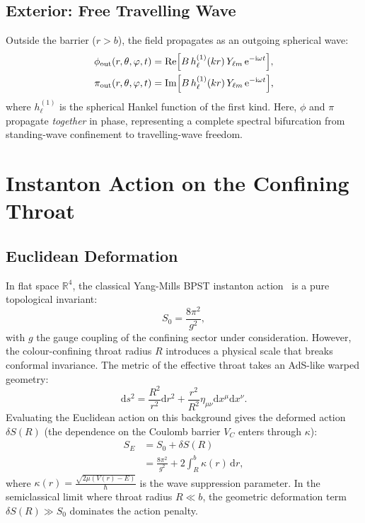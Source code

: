 \documentclass[11pt,a4paper]{article}
\theoremstyle{remark}
\newcommand{\dd}{\mathrm{d}}
\newcommand{\ii}{\mathrm{i}}
\newcommand{\ee}{\mathrm{e}}
\begin{document}
\subsection{Exterior: Free Travelling Wave}
Outside the barrier ($r > b$), the field propagates as an outgoing spherical wave:
\begin{align}
\phi_{\text{out}}(r,\theta,\varphi,t) &= \operatorname{Re}\Bigl[B\,h_\ell^{(1)}(k r)\,Y_{\ell m}\,\ee^{-\ii\omega t}\Bigr], \\
\pi_{\text{out}}(r,\theta,\varphi,t) &= \operatorname{Im}\Bigl[B\,h_\ell^{(1)}(k r)\,Y_{\ell m}\,\ee^{-\ii\omega t}\Bigr],
\end{align}
where $h_\ell^{(1)}$ is the spherical Hankel function of the first kind. Here, $\phi$ and $\pi$ propagate \emph{together} in phase, representing a complete spectral bifurcation from standing-wave confinement to travelling-wave freedom.

\section{Instanton Action on the Confining Throat}

\subsection{Euclidean Deformation}
In flat space $\mathbb{R}^4$, the classical Yang-Mills BPST instanton action~\cite{bpst1975} is a pure topological invariant:
\begin{equation}
S_0 = \frac{8\pi^2}{g^2},
\end{equation}
with $g$ the gauge coupling of the confining sector under consideration.
However, the colour-confining throat radius $R$ introduces a physical scale that breaks conformal invariance. The metric of the effective throat takes an AdS-like warped geometry:
\begin{equation}
\dd s^2 = \frac{R^2}{r^2}\dd r^2 + \frac{r^2}{R^2}\eta_{\mu\nu}\dd x^\mu \dd x^\nu.
\end{equation}
Evaluating the Euclidean action on this background gives the deformed action $\delta S(R)$ (the dependence on the Coulomb barrier $V_C$ enters through $\kappa$):
\begin{align}
S_E &= S_0 + \delta S(R) \nonumber \\
    &= \frac{8\pi^2}{g^2} + 2\int_{R}^{b} \kappa(r)\,\dd r,
\end{align}
where $\kappa(r) = \frac{\sqrt{2\mu (V(r) - E)}}{\hbar}$ is the wave suppression parameter. In the semiclassical limit where throat radius $R \ll b$, the geometric deformation term $\delta S(R) \gg S_0$ dominates the action penalty.
\end{document}
